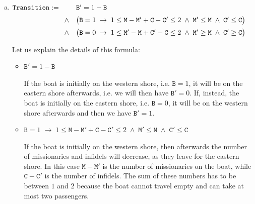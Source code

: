 \begin{enumerate}[(a)]
\begin{itemize}
            If neither $\mathtt{M} = 3$ nor $\mathtt{M} = 0$ holds, then the number of missionaries and
            cannibals has to be the same on the western shore, because if, for example, there were more
            missionaries on the western shore than cannibals, then there would be fewer missionaries than
            cannibals on the eastern shore and hence there would be a problem.
      \end{itemize}
      The condition $\mathtt{B} \leq 1$ is needed because there is just one boat, but the set $\mathcal{U}$ of
      values also includes the numbers $2$ and $3$.
\item $\texttt{Transition} :=
      \begin{array}[t]{cl}
         &  \mathtt{B}' = 1 - \mathtt{B}   \\[0.2cm]
        \wedge & \bigl(\mathtt{B} = 1 \;\rightarrow\; 1 \leq \mathtt{M} - \mathtt{M}'  + \mathtt{C} - \mathtt{C}' \leq 2 \;\wedge\;
        \mathtt{M}' \leq \mathtt{M} \;\wedge\; \mathtt{C}' \leq \mathtt{C}\bigr) \\[0.2cm]
        \wedge & \bigl(\mathtt{B} = 0 \;\rightarrow\; 1 \leq \mathtt{M}' - \mathtt{M}  + \mathtt{C}' - \mathtt{C} \leq 2 \;\wedge\;
                \mathtt{M}' \geq \mathtt{M} \;\wedge\; \mathtt{C}' \geq \mathtt{C}\bigr) 
      \end{array}
      $

      Let us explain the details of this formula:
      \begin{itemize}
      \item $\mathtt{B}' = 1 - \mathtt{B}$

            If the boat is initially on the western shore, i.e. $\texttt{B} = 1$, it will be on the eastern
            shore afterwards, i.e. we will then have $\texttt{B}' = 0$.  If, instead, the boat is initially on
            the eastern shore, i.e. $\texttt{B} = 0$, it will be on the western
            shore afterwards and then we have $\texttt{B}' = 1$.
      \item $\mathtt{B} = 1 \;\rightarrow\; 1 \leq \mathtt{M} - \mathtt{M}'  + \mathtt{C} - \mathtt{C}' \leq 2 \;\wedge\;
             \mathtt{M}' \leq \mathtt{M} \;\wedge\; \mathtt{C}' \leq \mathtt{C}$


            If the boat is initially on the western shore, then afterwards the number of missionaries and
            infidels will decrease, as they leave for the eastern shore.  In this case $\texttt{M} - \texttt{M}'$
            is the number of missionaries on the boat, while $\texttt{C} - \texttt{C}'$ is the number of
            infidels.  The sum of these numbers has to be between $1$ and $2$ because the boat cannot travel
            empty and can take at most two passengers.


\end{itemize}
\end{enumerate}
